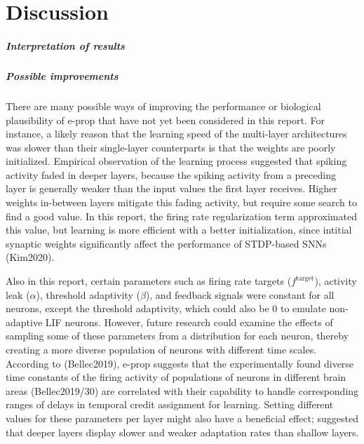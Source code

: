 \chapter{Discussion}\label{ch:discussion}

\paragraph{Interpretation of results}



\paragraph{Possible improvements}
    There are many possible ways of improving the performance or biological plausibility of e-prop that have not yet been considered in this report.
    For instance, a likely reason that the learning speed of the multi-layer architectures was slower than their single-layer counterparts is that the weights are poorly initialized.
    Empirical observation of the learning process suggested that spiking activity faded in deeper layers, because the spiking activity from a preceding layer is generally weaker than the input values the first layer receives.
    Higher weights in-between layers mitigate this fading activity, but require some search to find a good value.
    In this report, the firing rate regularization term approximated this value, but learning is more efficient with a better initialization, since intitial synaptic weights significantly affect the performance of STDP-based SNNs (Kim2020).

    Also in this report, certain parameters such as firing rate targets ($f^\text{target}$), activity leak ($\alpha$), threshold adaptivity ($\beta$), and feedback signals were constant for all neurons, except the threshold adaptivity, which could also be 0 to emulate non-adaptive LIF neurons.
    However, future research could examine the effects of sampling some of these parameters from a distribution for each neuron, thereby creating a more diverse population of neurons with different time scales.
    According to (Bellec2019), e-prop suggests that the experimentally found diverse time constants of the firing activity of populations of neurons in different brain areas (Bellec2019/30) are correlated with their capability to handle corresponding ranges of delays in temporal credit assignment for learning.
    Setting different values for these parameters per layer might also have a beneficial effect; \citet{ahmed1998estimates} suggested that deeper layers display slower and weaker adaptation rates than shallow layers.

